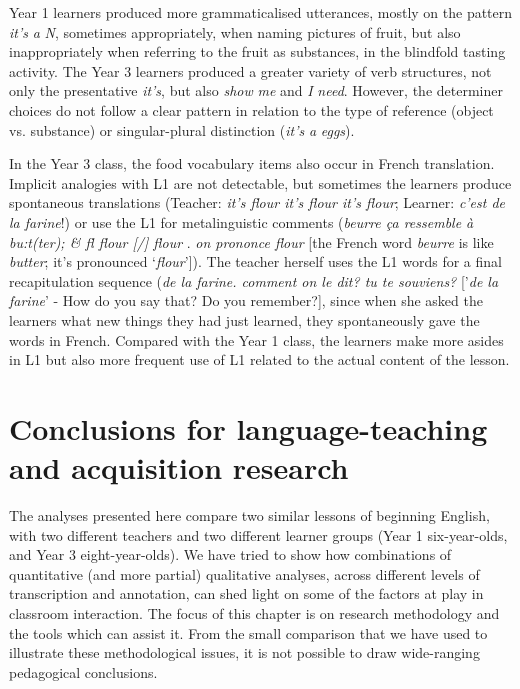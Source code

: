 \documentclass[output=paper,colorlinks,citecolor=brown,modfonts,nonflat]{../langscibook}
\begin{document}
Year 1 learners produced more grammaticalised utterances, mostly on the pattern \textit{it’s} \textit{a} \textit{N}, sometimes appropriately, when naming pictures of fruit, but also inappropriately when referring to the fruit as substances, in the blindfold tasting activity. The Year 3 learners produced a greater variety of verb structures, not only the presentative \textit{it’s}, but also \textit{show} \textit{me} and \textit{I} \textit{need}. However, the determiner choices do not follow a clear pattern in relation to the type of reference (object vs. substance) or singular-plural distinction (\textit{it’s} \textit{a} \textit{eggs}). 

In the Year 3 class, the food vocabulary items also occur in French translation. Implicit analogies with L1 are not detectable, but sometimes the learners produce spontaneous translations (Teacher: \textit{it’s flour it’s flour it’s flour}; Learner: \textit{c’est de la farine}!) or use the L1 for metalinguistic comments (\textit{beurre ça ressemble à bu:t(ter); \& fl flour [/] flour} . \textit{on prononce flour} [the French word \textit{beurre} is like \textit{butter}; it’s pronounced ‘\textit{flour}’]). The teacher herself uses the L1 words for a final recapitulation sequence (\textit{de la farine. comment on le dit? tu te souviens?} ['\textit{de la farine}’ - How do you say that? Do you remember?], since when she asked the learners what new things they had just learned, they spontaneously gave the words in French. Compared with the Year 1 class, the learners make more asides in L1 but also more frequent use of L1 related to the actual content of the lesson.

\section{{Conclusions for language-teaching and acquisition research}}\label{sec:hilton:5}

The analyses presented here compare two similar lessons of beginning English, with two different teachers and two different learner groups (Year 1 six-year-olds, and Year 3 eight-year-olds). We have tried to show how combinations of quantitative (and more partial) qualitative analyses, across different levels of transcription and annotation, can shed light on some of the factors at play in classroom interaction. The focus of this chapter is on research methodology and the tools which can assist it. From the small comparison that we have used to illustrate these methodological issues, it is not possible to draw wide-ranging pedagogical conclusions. 
\end{document}
